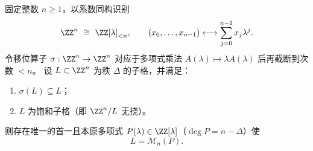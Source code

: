\begin{conjecture}\label{conj:pom-hankel-shift-invariant-saturated-principal}
固定整数 \(n\ge 1\)，以系数同构识别
\[
\ZZ^n\ \cong\ \ZZ[\lambda]_{<n},\qquad
(x_0,\dots,x_{n-1})\longleftrightarrow \sum_{j=0}^{n-1}x_j\lambda^j.
\]
令移位算子 \(\sigma:\ZZ^n\to\ZZ^n\) 对应于多项式乘法 \(A(\lambda)\mapsto \lambda A(\lambda)\) 后再截断到次数 \(<n\)。
设 \(L\subset\ZZ^n\) 为秩 \(\Delta\) 的子格，并满足：
\begin{enumerate}
  \item \(\sigma(L)\subseteq L\)；
  \item \(L\) 为饱和子格（即 \(\ZZ^n/L\) 无挠）。
\end{enumerate}
则存在唯一的首一且本原多项式 \(P(\lambda)\in\ZZ[\lambda]\)（\(\deg P=n-\Delta\)）使
\[
L=\mathcal M_n(P).
\]
\end{conjecture}

\endinput
